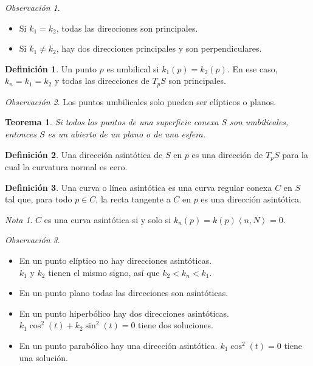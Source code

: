 \documentclass{report}
\newtheorem{theorem}{Teorema}[chapter]
\theoremstyle{remark}
\newtheorem*{remark}{Observación}
\theoremstyle{remark}
\newtheorem*{note}{Nota}
\theoremstyle{definition}
\newtheorem{definition}{Definición}[chapter]
\theoremstyle{definition}
\theoremstyle{definition}
\begin{document}
\begin{remark}
    \hfill
    \begin{itemize}
        \item Si $k_1 = k_2$, todas las direcciones son principales.
        \item Si $k_1 \neq k_2$, hay dos direcciones principales y son perpendiculares.
    \end{itemize}
\end{remark}

\begin{definition}
    Un punto $p$ es umbilical si $k_1(p) = k_2(p)$.
    En ese caso, $k_n = k_1 = k_2$ y todas las direcciones de $T_pS$ son principales.
\end{definition}

\begin{remark}
    Los puntos umbilicales solo pueden ser elípticos o planos.
\end{remark}

\begin{theorem}
    Si todos los puntos de una superficie conexa $S$ son umbilicales, entonces $S$ es un abierto de un plano o de una esfera.
\end{theorem}

\begin{definition}
    Una dirección asintótica de $S$ en $p$ es una dirección de $T_pS$ para la cual la curvatura normal es cero.
\end{definition}

\begin{definition}
    Una curva o línea asintótica es una curva regular conexa $C$ en $S$ tal que, para todo $p \in C$, la recta tangente a $C$ en $p$ es una dirección asintótica.
\end{definition}

\begin{note}
    $C$ es una curva asintótica si y solo si $k_n(p) = k(p) \left\langle n, N \right\rangle = 0$.
\end{note}

\begin{remark}
    \hfill
    \begin{itemize}
        \item En un punto elíptico no hay direcciones asintóticas.\\
              $k_1$ y $k_2$ tienen el mismo signo, así que $k_2 < k_n < k_1$.
        \item En un punto plano todas las direcciones son asintóticas.
        \item En un punto hiperbólico hay dos direcciones asintóticas.\\
              $k_1 \cos^2(t) + k_2 \sin^2(t) = 0$ tiene dos soluciones.
        \item En un punto parabólico hay una dirección asintótica.
              $k_1 \cos^2(t) = 0$ tiene una solución.
    \end{itemize}
\end{remark}
\end{document}
